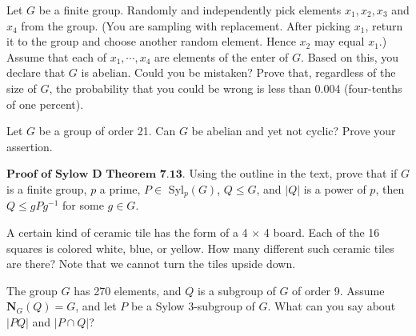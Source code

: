 \documentclass[12pt,letterpaper,boxed]{hmcpset}
\begin{document}

\begin{problem}[5.4.8]
Let $G$ be a finite group. Randomly and independently pick elements $x_1, x_2, x_3$ and $x_4$ from the group. (You are sampling with replacement. After picking $x_1$, return it to the group and choose another random element. Hence $x_2$ may equal $x_1$.) Assume that each of $ x_1,\cdots , x_4$ are elements of the enter of $G$. Based on this, you declare that $G$ is abelian. Could you be mistaken? Prove that, regardless of the size of $G$, the probability that you could be wrong is less than 0.004 (four-tenths of one percent). 
\end{problem}

\begin{solution}

\end{solution}

\clearpage

\begin{problem}[7.2.8]
Let $G$ be a group of order 21. Can $G$ be abelian and yet not cyclic? Prove your assertion. 
\end{problem}

\begin{solution}
\end{solution}

\clearpage

\begin{problem}[7.3.1]
$\textbf{Proof of Sylow D Theorem 7.13.}$ Using the outline in the text, prove that if $G$ is a finite group, $p$ a prime, $ P \in $ Syl$_p(G)$, $ Q \leq G$, and $ \vert Q \vert $ is a power of $p$, then $ Q \leq gPg^{-1} $ for some $g \in G$. 
\end{problem}

\begin{solution}
\end{solution}

\clearpage


\begin{problem}[8.2.7]
A certain kind of ceramic tile has the form of a 4 $\times$ 4 board. Each of the 16 squares is colored white, blue, or yellow. How many different such ceramic tiles are there? Note that we cannot turn the tiles upside down. 
\end{problem}

\begin{solution}
\end{solution}

\clearpage

\begin{problem}[9.2.6]
The group $G$ has 270 elements, and $Q$ is a subgroup of $G$ of order 9.  Assume $\textbf{N}_G(Q) = G$, and let $P$ be a Sylow 3-subgroup of $G$. What can you say about $\vert PQ \vert$ and $\vert P \cap Q \vert$?
\end{problem}

\begin{solution}

\end{solution}
\end{document}

